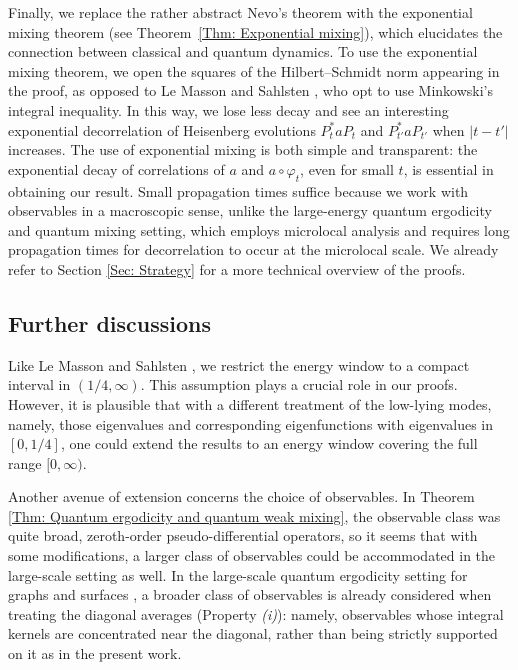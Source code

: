 \documentclass[11pt,twoside,reqno]{amsart} \usepackage{a4wide} \usepackage[T1]{fontenc} \usepackage[utf8]{inputenc} \usepackage{soul}  \usepackage{amsmath} \usepackage{amsfonts} \usepackage{amssymb} \usepackage{mathtools} \usepackage{amsthm} \usepackage{xcolor} \usepackage{graphicx} \usepackage{hyperref} \usepackage{standalone} \usepackage{esint} \usepackage{comment} \usepackage[left=2.3cm,top=3cm,right=2.3cm]{geometry} \usepackage{bm} \usepackage{svg} \usepackage{float} \numberwithin{equation}{section} \theoremstyle{plain} \newtheorem{thm}{Theorem}[section] \newtheorem{theorem}[thm]{Theorem} \newtheorem*{theorem*}{Theorem}\newtheorem{conj}[thm]{Conjecture} \newtheorem{lemma}[thm]{Lemma} \newtheorem{prop}[thm]{Proposition} \newtheorem{proposition}[thm]{Proposition} \newtheorem{cor}[thm]{Corollary} \newtheorem{question}[thm]{Question} \newtheorem{corollary}[thm]{Corollary} \newtheorem{assumption}[thm]{Assumption} \theoremstyle{definition} \newtheorem{defn}[thm]{Definition} \newtheorem{choice}[thm]{Choice} \newtheorem{definition}[thm]{Definition} \newtheorem{ex}[thm]{Example} \newtheorem{notation}[thm]{Notation} \newtheorem*{ack}{Acknowledgements} \theoremstyle{remark} \newtheorem{remark}[thm]{Remark} \newtheorem{bigremark}[thm]{Remark} \usepackage{xcolor} \newcommand{\red}[1]{ {\color{Red}#1} } \newcommand{\blue}[1]{ {\color{Blue}#1} } \author{Kai Hippi} \address{Aalto University, Espoo, Finland} \email{kai.hippi@aalto.fi}
\begin{document}
Finally, we replace the rather abstract Nevo’s theorem with the exponential mixing theorem (see Theorem~\ref{Thm: Exponential mixing}), which elucidates the connection between classical and quantum dynamics. To use the exponential mixing theorem, we open the squares of the Hilbert--Schmidt norm appearing in the proof, as opposed to Le Masson and Sahlsten \cite{LS17}, who opt to use Minkowski's integral inequality. In this way, we lose less decay and see an interesting exponential decorrelation of Heisenberg evolutions $ P_{t}^{*} a P_{t} $ and $ P_{t'}^{*} a P_{t'} $ when $ | t - t' | $ increases. The use of exponential mixing is both simple and transparent: the exponential decay of correlations of \( a \) and \( a \circ \varphi_{t} \), even for small \( t \), is essential in obtaining our result. Small propagation times suffice because we work with observables in a macroscopic sense, unlike the large-energy quantum ergodicity and quantum mixing setting, which employs microlocal analysis and requires long propagation times for decorrelation to occur at the microlocal scale. We already refer to Section \ref{Sec: Strategy} for a more technical overview of the proofs.


\subsection{Further discussions}

Like Le Masson and Sahlsten \cite{LS17}, we restrict the energy window to a compact interval in \( \left( 1/4, \infty \right) \). This assumption plays a crucial role in our proofs. However, it is plausible that with a different treatment of the low-lying modes, namely, those eigenvalues and corresponding eigenfunctions with eigenvalues in \( [0, 1/4] \), one could extend the results to an energy window covering the full range \( [0, \infty) \).

Another avenue of extension concerns the choice of observables. In Theorem \ref{Thm: Quantum ergodicity and quantum weak mixing}, the observable class was quite broad, zeroth-order pseudo-differential operators, so it seems that with some modifications, a larger class of observables could be accommodated in the large-scale setting as well. In the large-scale quantum ergodicity setting for graphs \cite{AL15} and surfaces \cite{ABL22}, a broader class of observables is already considered when treating the diagonal averages (Property \emph{(i)}): namely, observables whose integral kernels are concentrated near the diagonal, rather than being strictly supported on it as in the present work.
\end{document}

